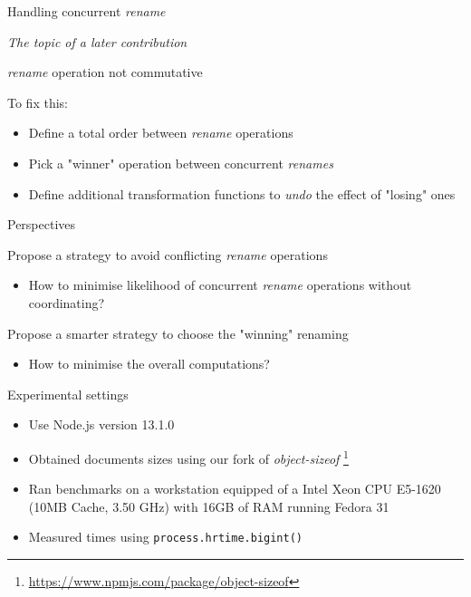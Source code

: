 \documentclass[10pt]{beamer}
\begin{document}
\begin{frame}{Handling concurrent \emph{rename}}
  \begin{center}
    \emph{The topic of a later contribution}
  \end{center}

  \begin{block}{\alert{\emph{rename} operation not commutative}}
  \end{block}

  \begin{block}{To fix this:}
    \begin{itemize}
      \item Define a total order between \emph{rename} operations
      \item Pick a "winner" operation between concurrent \emph{renames}
      \item Define additional transformation functions to \emph{undo} the effect of "losing" ones
    \end{itemize}
  \end{block}
\end{frame}

\begin{frame}{Perspectives}
  \begin{block}{Propose a strategy to avoid conflicting \emph{rename} operations}
    \begin{itemize}
      \item How to minimise likelihood of concurrent \emph{rename} operations without coordinating?
    \end{itemize}
  \end{block}

  \begin{block}{Propose a smarter strategy to choose the "winning" renaming}
    \begin{itemize}
      \item How to minimise the overall computations?
    \end{itemize}
  \end{block}
\end{frame}

\begin{frame}{Experimental settings}
  \begin{itemize}
    \item Use Node.js version 13.1.0
    \item Obtained documents sizes using our fork of \emph{object-sizeof} \footnote{\url{https://www.npmjs.com/package/object-sizeof}}
    \item Ran benchmarks on a workstation equipped of a Intel Xeon CPU E5-1620 (10MB Cache, 3.50 GHz) with 16GB of RAM running Fedora 31
    \item Measured times using \texttt{process.hrtime.bigint()}
  \end{itemize}
\end{frame}
\end{document}
